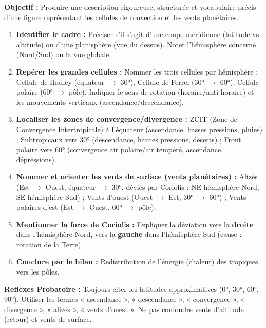 \documentclass[11pt]{article}
\newcommand{\cle}[1]{{\popxbold\color{popdark}#1}}
\begin{document}
\begin{methode}
\textbf{Objectif :} Produire une description rigoureuse, structurée et vocabulaire précis d'une figure représentant les cellules de convection et les vents planétaires.
\begin{enumerate}
    \item \textbf{Identifier le cadre :} Préciser s'il s'agit d'une coupe méridienne (latitude vs altitude) ou d'une planisphère (vue du dessus). Noter l'hémisphère concerné (Nord/Sud) ou la vue globale.
    \item \textbf{Repérer les grandes cellules :} Nommer les trois cellules par hémisphère : \cle{Cellule de Hadley} (équateur $\to$ 30°), \cle{Cellule de Ferrel} (30° $\to$ 60°), \cle{Cellule polaire} (60° $\to$ pôle). Indiquer le sens de rotation (horaire/anti-horaire) et les mouvements verticaux (ascendance/descendance).
    \item \textbf{Localiser les zones de convergence/divergence :} \cle{ZCIT} (Zone de Convergence Intertropicale) à l'équateur (ascendance, basses pressions, pluies) ; \cle{Subtropicaux} vers 30° (descendance, hautes pressions, déserts) ; \cle{Front polaire} vers 60° (convergence air polaire/air tempéré, ascendance, dépressions).
    \item \textbf{Nommer et orienter les vents de surface (vents planétaires) :} \cle{Alizés} (Est $\to$ Ouest, équateur $\to$ 30°, déviés par Coriolis : NE hémisphère Nord, SE hémisphère Sud) ; \cle{Vents d'ouest} (Ouest $\to$ Est, 30° $\to$ 60°) ; \cle{Vents polaires d'est} (Est $\to$ Ouest, 60° $\to$ pôle).
    \item \textbf{Mentionner la force de Coriolis :} Expliquer la déviation vers la \textbf{droite} dans l'hémisphère Nord, vers la \textbf{gauche} dans l'hémisphère Sud (cause : rotation de la Terre).
    \item \textbf{Conclure par le bilan :} Redistribution de l'énergie (chaleur) des tropiques vers les pôles.
\end{enumerate}
\textbf{Reflexes Probatoire :} Toujours citer les latitudes approximatives (0°, 30°, 60°, 90°). Utiliser les termes « ascendance », « descendance », « convergence », « divergence », « alizés », « vents d'ouest ». Ne pas confondre vents d'altitude (retour) et vents de surface.
\end{methode}
\end{document}
